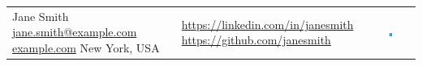\begin{tabularx}{\linewidth}{@{} m{} m{} m{} @{}}
{
    \large{Jane Smith}
    \newline
    \small{
        \href{mailto:jane.smith@example.com}{jane.smith@example.com}
        \newline
        \href{https://example.com}{example.com}
        \newline
        New York, USA
    }
} &
{
    \large{\hspace{0cm}}
    \newline
    \small{
        \href{https://linkedin.com/in/janesmith}{https://linkedin.com/in/janesmith}
        \newline
        \href{https://github.com/janesmith}{https://github.com/janesmith}
        \newline
    }
} &
{
    \includegraphics[width=0.153\textwidth]{src/avatar.png}
}
\end{tabularx}

